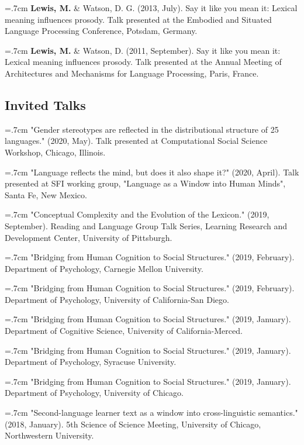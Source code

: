 \documentclass[letterpaper]{article}
\begin{document}
  \hangindent=.7cm {\bf Lewis, M.} \& Watson, D. G.  (2013, July). Say it like you mean it: Lexical meaning influences prosody. Talk presented at the Embodied and Situated Language Processing Conference, Potsdam, Germany.


 \hangindent=.7cm {\bf Lewis, M.}  \& Watson, D. (2011, September). Say it like you mean it: Lexical meaning influences prosody. Talk presented at the Annual Meeting of Architectures and Mechanisms for Language Processing, Paris, France.


\subsection*{Invited Talks}

\hangindent=.7cm "Gender stereotypes are reflected in the distributional structure of 25 languages." (2020, May). Talk presented at Computational Social Science Workshop, Chicago, Illinois.

\hangindent=.7cm "Language reflects the mind, but does it also shape it?" (2020, April). Talk presented at SFI working group, "Language as a Window into Human Minds", Santa Fe, New Mexico.

\hangindent=.7cm "Conceptual Complexity and the Evolution of the Lexicon." (2019, September). Reading and Language Group Talk Series, Learning Research and Development Center, University of Pittsburgh.

\hangindent=.7cm "Bridging from Human Cognition to Social Structures." (2019, February). Department of Psychology, Carnegie Mellon University.

\hangindent=.7cm "Bridging from Human Cognition to Social Structures." (2019, February). Department of Psychology, University of California-San Diego.

\hangindent=.7cm "Bridging from Human Cognition to Social Structures." (2019, January). Department of Cognitive Science, University of California-Merced.

\hangindent=.7cm "Bridging from Human Cognition to Social Structures." (2019, January). Department of Psychology, Syracuse University.

\hangindent=.7cm "Bridging from Human Cognition to Social Structures." (2019, January). Department of Psychology, University of Chicago.

\hangindent=.7cm "Second-language learner text as a window into cross-linguistic semantics." (2018, January). 5th Science of Science Meeting,  University of Chicago, Northwestern University.
\end{document}
